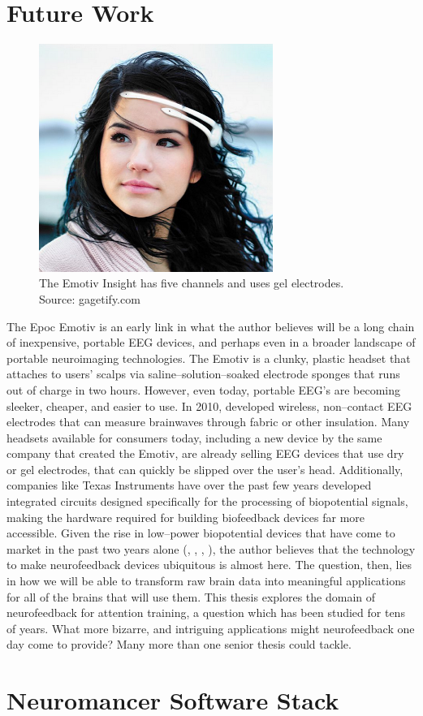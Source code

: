 \documentclass[12pt]{report}
\begin{document}
\chapter{Future Work}	
	
		\begin{figure}
	\centering
	\includegraphics[width=3in]{insight}
	\caption{The Emotiv Insight has five channels and uses gel electrodes.  Source: gagetify.com \label{insight}}
	\end{figure}The Epoc Emotiv is an early link in what the author believes will be a long chain of inexpensive, portable EEG devices, and perhaps even in a broader landscape of portable neuroimaging technologies.  The Emotiv is a clunky, plastic headset that attaches to users' scalps via saline--solution--soaked electrode sponges that runs out of charge in two hours.  However, even today, portable EEG's are becoming sleeker, cheaper, and easier to use.  In 2010, \cite{Chi} developed wireless, non--contact EEG electrodes that can measure brainwaves through fabric or other insulation.  Many headsets available for consumers today, including a new device by the same company that created the Emotiv, are already selling EEG devices that use dry or gel electrodes, that can quickly be slipped over the user's head.  Additionally, companies like Texas Instruments have over the past few years developed integrated circuits designed specifically for the processing of biopotential signals\cite{ti}, making the hardware required for building biofeedback devices far more accessible.  Given the rise in low--power biopotential devices that have come to market in the past two years alone (\cite{microsoft}, \cite{openbci}, \cite{zeo}, \cite{melon}), the author believes that the technology to make neurofeedback devices ubiquitous is almost here.  The question, then, lies in how we will be able to transform raw brain data into meaningful applications for all of the brains that will use them.  This thesis explores the domain of neurofeedback for attention training, a question which has been studied for tens of years.  What more bizarre, and intriguing applications might neurofeedback one day come to provide?  Many more than one senior thesis could tackle.    

	
		
	
	
\appendix

\chapter{Neuromancer Software Stack}


{}

\end{document}
